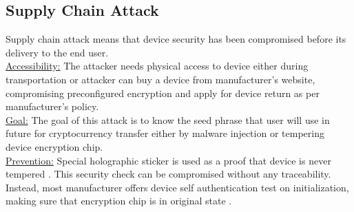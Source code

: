 \documentclass[conference]{IEEEtran}
\begin{document}
\subsection{Supply Chain Attack}
Supply chain attack means that device security has been compromised before its delivery to the end user. \\
\underline{Accessibility:} The attacker needs physical access to device either during transportation or attacker can buy a device from 
manufacturer's website, compromising preconfigured encryption and apply for device return as per manufacturer's policy. \\
\underline{Goal:} The goal of this attack is to know the seed phrase that user will use in future for cryptocurrency transfer either by 
malware injection or tempering device encryption chip. \\
\underline{Prevention:} Special holographic sticker is used as a proof that device is never tempered \cite{ledgerdata2}. This security 
check can be compromised without any traceability. Instead, most manufacturer offers device self authentication test on initialization, 
making sure that encryption chip is in original state \cite{volotikin2018software}. 

\end{document}
